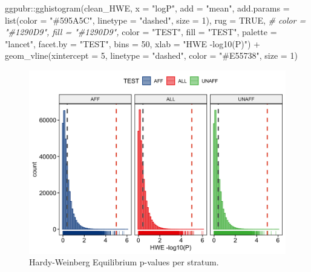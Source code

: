 \documentclass[
]{book}
\newenvironment{Shaded}{\begin{snugshade}}{\end{snugshade}}
\newcommand{\AttributeTok}[1]{\textcolor[rgb]{0.77,0.63,0.00}{#1}}
\newcommand{\CommentTok}[1]{\textcolor[rgb]{0.56,0.35,0.01}{\textit{#1}}}
\newcommand{\ConstantTok}[1]{\textcolor[rgb]{0.00,0.00,0.00}{#1}}
\newcommand{\DecValTok}[1]{\textcolor[rgb]{0.00,0.00,0.81}{#1}}
\newcommand{\FunctionTok}[1]{\textcolor[rgb]{0.00,0.00,0.00}{#1}}
\newcommand{\NormalTok}[1]{#1}
\newcommand{\SpecialCharTok}[1]{\textcolor[rgb]{0.00,0.00,0.00}{#1}}
\newcommand{\StringTok}[1]{\textcolor[rgb]{0.31,0.60,0.02}{#1}}
\begin{document}
\begin{Shaded}
\begin{Highlighting}[]
\NormalTok{ggpubr}\SpecialCharTok{::}\FunctionTok{gghistogram}\NormalTok{(clean\_HWE, }\AttributeTok{x =} \StringTok{"logP"}\NormalTok{,}
                    \AttributeTok{add =} \StringTok{"mean"}\NormalTok{,}
                    \AttributeTok{add.params =} \FunctionTok{list}\NormalTok{(}\AttributeTok{color =} \StringTok{"\#595A5C"}\NormalTok{, }\AttributeTok{linetype =} \StringTok{"dashed"}\NormalTok{, }\AttributeTok{size =} \DecValTok{1}\NormalTok{),}
                    \AttributeTok{rug =} \ConstantTok{TRUE}\NormalTok{,}
                    \CommentTok{\# color = "\#1290D9", fill = "\#1290D9",}
                    \AttributeTok{color =} \StringTok{"TEST"}\NormalTok{, }\AttributeTok{fill =} \StringTok{"TEST"}\NormalTok{,}
                    \AttributeTok{palette =} \StringTok{"lancet"}\NormalTok{,}
                    \AttributeTok{facet.by =} \StringTok{"TEST"}\NormalTok{,}
                    \AttributeTok{bins =} \DecValTok{50}\NormalTok{,}
                    \AttributeTok{xlab =} \StringTok{"HWE {-}log10(P)"}\NormalTok{) }\SpecialCharTok{+}
  \FunctionTok{geom\_vline}\NormalTok{(}\AttributeTok{xintercept =} \DecValTok{5}\NormalTok{, }\AttributeTok{linetype =} \StringTok{"dashed"}\NormalTok{,}
                \AttributeTok{color =} \StringTok{"\#E55738"}\NormalTok{, }\AttributeTok{size =} \DecValTok{1}\NormalTok{)}
\end{Highlighting}
\end{Shaded}

\begin{figure}

{\centering \includegraphics[width=18.67in]{img/_gwas/show-hwe} 

}

\caption{Hardy-Weinberg Equilibrium p-values per stratum.}\label{fig:show-hwe}
\end{figure}
\end{document}
